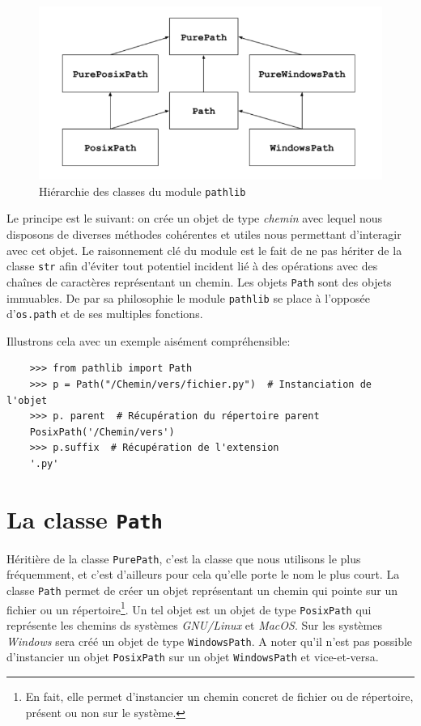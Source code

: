 \documentclass[a4paper,11pt]{book}
\begin{document}
\begin{figure}[h]
\begin{center}
\includegraphics[scale=0.5]{IMG/Pathlib-01.png}
\caption{Hiérarchie des classes du module \texttt{pathlib}}
\end{center}
\end{figure}
\medskip

Le principe est le suivant: on crée un objet de type \textit{chemin} avec lequel nous disposons de diverses méthodes cohérentes et utiles nous permettant d'interagir avec cet objet. Le raisonnement clé du module est le fait de ne pas hériter de la classe \texttt{str} afin d'éviter tout potentiel incident lié à des opérations avec des chaînes de caractères représentant un chemin. Les objets \texttt{Path} sont des objets immuables. De par sa philosophie le module \texttt{pathlib} se place à l'opposée d'\texttt{os.path} et de ses multiples fonctions.
\medskip

Illustrons cela avec un exemple aisément compréhensible:
\begin{verbatim}
    >>> from pathlib import Path
    >>> p = Path("/Chemin/vers/fichier.py")  # Instanciation de l'objet
    >>> p. parent  # Récupération du répertoire parent
    PosixPath('/Chemin/vers')
    >>> p.suffix  # Récupération de l'extension
    '.py'
\end{verbatim}
\medskip

\section{La classe \texttt{Path}}
Héritière de la classe \texttt{PurePath}, c'est la classe que nous utilisons le plus fréquemment, et c'est d'ailleurs pour cela qu'elle porte le nom le plus court. La classe \texttt{Path} permet de créer un objet représentant un chemin qui pointe sur un fichier ou un répertoire\footnote{En fait, elle permet d'instancier un chemin concret de fichier ou de répertoire, présent ou non sur le système.}. Un tel objet est un objet de type \texttt{PosixPath} qui représente les chemins ds systèmes \textit{GNU/Linux} et \textit{MacOS}. Sur les systèmes \textit{Windows} sera créé un objet de type \texttt{WindowsPath}. A noter qu'il n'est pas possible d'instancier un objet \texttt{PosixPath} sur un objet \texttt{WindowsPath} et vice-et-versa.
\medskip
\end{document}
